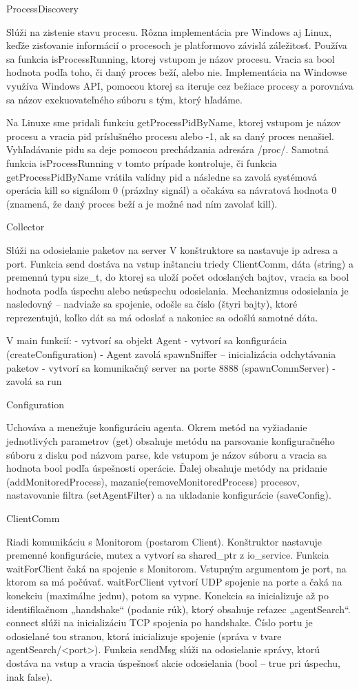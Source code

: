 \documentclass[a4paper,12pt]{article}
\begin{document}
ProcessDiscovery

Slúži na zistenie stavu procesu. Rôzna implementácia pre Windows aj Linux, keďže zisťovanie informácií o procesoch je platformovo závislá záležitosť. Používa sa funkcia isProcessRunning, ktorej vstupom je názov procesu. Vracia sa bool hodnota podľa toho, či daný proces beží, alebo nie. Implementácia na Windowse využíva Windows API, pomocou ktorej sa iteruje cez bežiace procesy a porovnáva sa názov exekuovateľného súboru s tým, ktorý hľadáme. 

Na Linuxe sme pridali funkciu getProcessPidByName, ktorej vstupom je názov procesu a vracia pid príslušného procesu alebo -1, ak sa daný proces nenašiel. Vyhľadávanie pidu sa deje pomocou prechádzania adresára /proc/. Samotná funkcia isProcessRunning v tomto prípade kontroluje, či funkcia getProcessPidByName vrátila valídny pid a následne sa zavolá systémová operácia kill so signálom 0 (prázdny signál) a očakáva sa návratová hodnota 0 (znamená, že daný proces beží a je možné nad ním zavolať kill).

Collector

Slúži na odosielanie paketov na server
V konštruktore sa nastavuje ip adresa a port. Funkcia send dostáva na vstup inštanciu triedy ClientComm, dáta (string) a premennú typu size\_t, do ktorej sa uloží počet odoslaných bajtov, vracia sa bool hodnota podľa úspechu alebo neúspechu odosielania. Mechanizmus odosielania je nasledovný – nadviaže sa spojenie, odošle sa číslo (štyri bajty), ktoré reprezentujú, koľko dát sa má odoslať a nakoniec sa odošlú samotné dáta.

V main funkcií:
- vytvorí sa objekt Agent
- vytvorí sa konfigurácia (createConfiguration)
- Agent zavolá spawnSniffer – inicializácia odchytávania paketov
- vytvorí sa komunikačný server na porte 8888 (spawnCommServer)
- zavolá sa run

Configuration

Uchováva a menežuje konfiguráciu agenta. Okrem metód na vyžiadanie jednotlivých parametrov (get) obsahuje metódu na parsovanie konfiguračného súboru z disku pod názvom parse, kde vstupom je názov súboru a vracia sa hodnota bool podľa úspešnosti operácie. Ďalej obsahuje metódy na pridanie (addMonitoredProcess), mazanie(removeMonitoredProcess) procesov, nastavovanie filtra (setAgentFilter) a na ukladanie konfigurácie (saveConfig).

ClientComm

Riadi komunikáciu s Monitorom (postarom Client). Konštruktor nastavuje premenné konfigurácie, mutex a vytvorí sa shared\_ptr z io\_service. Funkcia waitForClient čaká na spojenie s Monitorom. Vstupným argumentom je port, na ktorom sa má počúvať. waitForClient vytvorí UDP spojenie na porte a čaká na konekciu (maximálne jednu), potom sa vypne. Konekcia sa inicializuje až po identifikačnom „handshake“ (podanie rúk), ktorý obsahuje reťazec „agentSearch“. connect slúži na inicializáciu TCP spojenia po handshake. Číslo portu je odosielané tou stranou, ktorá inicializuje spojenie (správa v tvare agentSearch/<port>). Funkcia sendMsg slúži na odosielanie správy, ktorú dostáva na vstup a vracia úspešnosť akcie odosielania (bool – true pri úspechu, inak false). 
\end{document}
